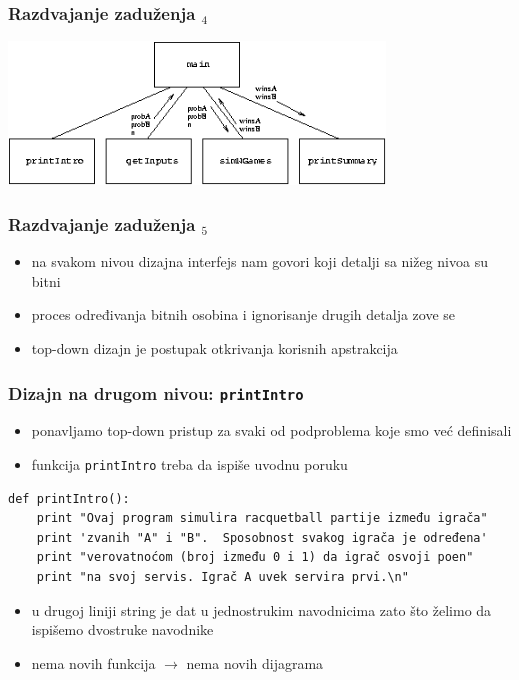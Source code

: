 \documentclass[utf8,compress]{beamer}
\begin{document}
\begin{frame}
  \frametitle{Razdvajanje zaduženja $_4$}
  \begin{center}
    \includegraphics[width=10cm]{pic22}
  \end{center}
\end{frame}

\begin{frame}
  \frametitle{Razdvajanje zaduženja $_5$}
  \begin{itemize}
    \item na svakom nivou dizajna interfejs nam govori koji detalji sa nižeg nivoa su bitni
    \item proces određivanja bitnih osobina i ignorisanje drugih detalja zove se 
    \item top-down dizajn je postupak otkrivanja korisnih apstrakcija
  \end{itemize}
\end{frame}

\begin{frame}[fragile,shrink=15]
  \frametitle{Dizajn na drugom nivou: \texttt{printIntro}}
  \begin{itemize}
    \item ponavljamo top-down pristup za svaki od podproblema koje smo već definisali
    \item funkcija \texttt{printIntro} treba da ispiše uvodnu poruku
  \end{itemize}
\begin{verbatim}
def printIntro():
    print "Ovaj program simulira racquetball partije između igrača"
    print 'zvanih "A" i "B".  Sposobnost svakog igrača je određena'
    print "verovatnoćom (broj između 0 i 1) da igrač osvoji poen"
    print "na svoj servis. Igrač A uvek servira prvi.\n"
\end{verbatim}
  \begin{itemize}
    \item u drugoj liniji string je dat u jednostrukim navodnicima zato što želimo da ispišemo dvostruke navodnike
    \item nema novih funkcija $\rightarrow$ nema novih dijagrama
  \end{itemize}
\end{frame}
\end{document}
